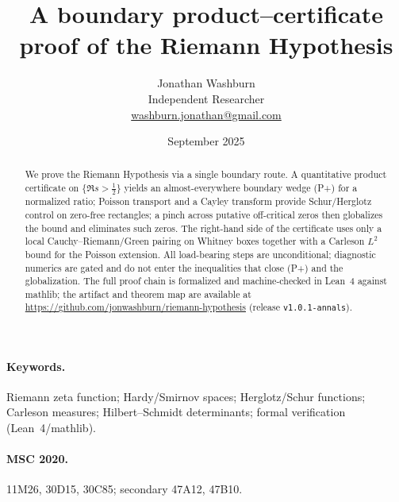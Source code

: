 \documentclass[11pt]{article}
\title{A boundary product--certificate proof of the Riemann Hypothesis}
\author{Jonathan Washburn\\ Independent Researcher\\ \href{mailto:washburn.jonathan@gmail.com}{washburn.jonathan@gmail.com}}
\date{September 2025}
\theoremstyle{definition}
\theoremstyle{remark}
\begin{document}
\maketitle

\begin{abstract}
We prove the Riemann Hypothesis via a single boundary route. A quantitative product certificate on $\{\Re s>\tfrac12\}$ yields an almost-everywhere boundary wedge (P+) for a normalized ratio; Poisson transport and a Cayley transform provide Schur/Herglotz control on zero-free rectangles; a pinch across putative off-critical zeros then globalizes the bound and eliminates such zeros. The right-hand side of the certificate uses only a local Cauchy--Riemann/Green pairing on Whitney boxes together with a Carleson $L^2$ bound for the Poisson extension. All load-bearing steps are unconditional; diagnostic numerics are gated and do not enter the inequalities that close (P+) and the globalization. The full proof chain is formalized and machine-checked in Lean~4 against mathlib; the artifact and theorem map are available at \url{https://github.com/jonwashburn/riemann-hypothesis} (release \texttt{v1.0.1-annals}).
\end{abstract}

\paragraph{Keywords.} Riemann zeta function; Hardy/Smirnov spaces; Herglotz/Schur functions; Carleson measures; Hilbert--Schmidt determinants; formal verification (Lean~4/mathlib).

\paragraph{MSC 2020.} 11M26, 30D15, 30C85; secondary 47A12, 47B10.
\end{document}
